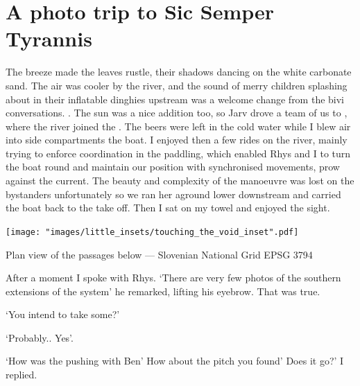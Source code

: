 \section{A photo trip to Sic Semper Tyrannis}
                    
    The breeze made the leaves rustle, their shadows dancing on the white carbonate sand. The air was cooler by the  river, and the sound of merry children splashing about in their inflatable dinghies upstream was a welcome change from the bivi conversations.
    . The sun was a nice addition too, so Jarv drove a team of us to , where the  river joined the . The beers were left in the cold water while I blew air into side compartments the boat.
    I enjoyed then a few rides on the river, mainly trying to enforce coordination in the paddling, which enabled Rhys and I to turn the boat round and maintain our position with synchronised movements, prow against the current. The beauty and complexity of the manoeuvre was lost on the bystanders unfortunately so we ran her aground lower downstream and carried the boat back to the take off. Then I sat on my towel and enjoyed the sight.


\begin{marginsurvey}
	\texttt{[image: "images/little\_insets/touching\_the\_void\_inset".pdf]}
	\caption[Davy Jones' Locker]{Plan view of the passages below \protect{} --- Slovenian National Grid EPSG 3794}
\end{marginsurvey}


    After a moment I spoke with Rhys.
    `There are very few photos of the southern extensions of the system' he remarked, lifting his eyebrow.  That was true. 

`You intend to take some?'

    `Probably.. Yes'.

    `How was the pushing with Ben' How about the pitch you found' Does it go?' I replied.

